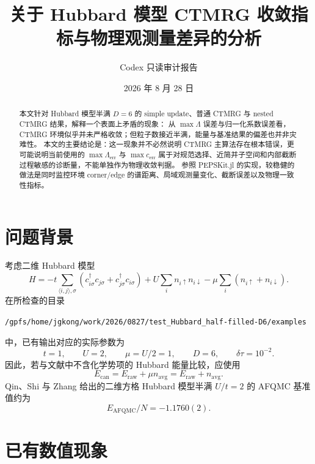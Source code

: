 \documentclass[11pt,a4paper]{ctexart}
\title{关于 Hubbard 模型 CTMRG 收敛指标与物理观测量差异的分析}
\author{Codex 只读审计报告}
\date{2026 年 8 月 28 日}
\newcommand{\ctmrg}{CTMRG}
\newcommand{\pepskit}{PEPSKit.jl}
\newcommand{\Eraw}{E_{\mathrm{raw}}}
\newcommand{\Ecan}{E_{\mathrm{can}}}
\newcommand{\nb}{n_{\mathrm{avg}}}
\begin{document}
\maketitle

\begin{abstract}
本文针对 Hubbard 模型半满 $D=6$ 的 simple update、普通 \ctmrg{} 与 nested \ctmrg{} 结果，解释一个表面上矛盾的现象：
从 $\max\Lambda$ 误差与归一化系数误差看，\ctmrg{} 环境似乎并未严格收敛；但粒子数接近半满，能量与基准结果的偏差也并非灾难性。
本文的主要结论是：这一现象并不必然说明 \ctmrg{} 主算法存在根本错误，更可能说明当前使用的 $\max\Lambda_{\mathrm{err}}$ 与 $\max c_{\mathrm{err}}$ 属于对规范选择、近简并子空间和内部截断过程敏感的诊断量，不能单独作为物理收敛判据。
参照 \pepskit{} 的实现，较稳健的做法是同时监控环境 corner/edge 的谱距离、局域观测量变化、截断误差以及物理一致性指标。
\end{abstract}

\section{问题背景}

考虑二维 Hubbard 模型
\begin{equation}
  H
  =
  -t\sum_{\langle i,j\rangle,\sigma}
  \left(
    c^{\dagger}_{i\sigma}c_{j\sigma}
    +
    c^{\dagger}_{j\sigma}c_{i\sigma}
  \right)
  +
  U\sum_i n_{i\uparrow}n_{i\downarrow}
  -
  \mu\sum_i (n_{i\uparrow}+n_{i\downarrow}) .
  \label{eq:hubbard}
\end{equation}
在所检查的目录
\begin{center}
\texttt{/gpfs/home/jgkong/work/2026/0827/test\_Hubbard\_half-filled-D6/examples}
\end{center}
中，已有输出对应的实际参数为
\begin{equation}
  t=1,\qquad U=2,\qquad \mu=U/2=1,\qquad D=6,\qquad \delta\tau=10^{-2}.
\end{equation}
因此，若与文献中不含化学势项的 Hubbard 能量比较，应使用
\begin{equation}
  \Ecan
  =
  \Eraw + \mu\nb
  =
  \Eraw+\nb .
  \label{eq:canonical-energy}
\end{equation}
Qin、Shi 与 Zhang 给出的二维方格 Hubbard 模型半满 $U/t=2$ 的 AFQMC 基准值约为
\begin{equation}
  E_{\mathrm{AFQMC}}/N = -1.1760(2).
  \label{eq:benchmark}
\end{equation}

\section{已有数值现象}
\end{document}
